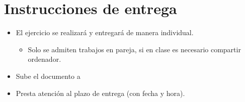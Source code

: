 \section{Instrucciones de entrega}
\begin{itemize}
\item El ejercicio se realizará y entregará de manera
  individual.
  \begin{itemize}
  \item Solo se admiten trabajos en pareja, si en clase es necesario compartir ordenador.
  \end{itemize}
\item Sube el documento a 
\item Presta atención al plazo de entrega (con fecha y hora).
\end{itemize}







